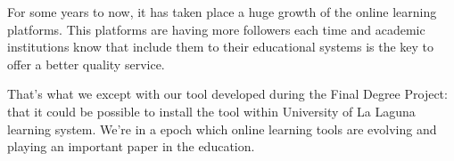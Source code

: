 


For some years to now, it has taken place a huge growth of the online learning platforms. This platforms are having more followers each time and
academic institutions know that include them to their educational systems is the key to offer a better quality service.


That's what we except with our tool developed during the Final Degree Project: that it could be possible to install the tool within University of La Laguna learning system.
We're in a epoch which online learning tools are evolving and playing an important paper in the education.
\bigskip

